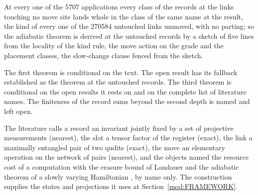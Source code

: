 \begin{chtheorem}\label{box:XIII-5-cost-of-a-read-and-the-adiabatic-class:3}
At every one of the 5707 applications every class of the records at the links touching no move site lands whole in the class of the same name at the result, the kind of every one of the 270584 untouched links unmoved, with no parting; so the adiabatic theorem is derived at the untouched records by a sketch of five lines from the locality of the kind rule, the move action on the grade and the placement classes, the slow-change clause fenced from the sketch.
\end{chtheorem}
The first theorem is conditional on the text. The open result has its fallback established as the theorem at the untouched records. The third theorem is conditional on the open results it rests on and on the complete list of literature names. The finiteness of the record sums beyond the second depth is named and left open.
\begin{chbridge}
The literature calls a record an invariant jointly fixed by a set of projective measurements (nearest), the slot a tensor factor of the register (exact), the link a maximally entangled pair of two qudits (exact), the move an elementary operation on the network of pairs (nearest), and the objects named the resource cost of a computation with the erasure bound of Landauer \cite{Landauer1961} and the adiabatic theorem of a slowly varying Hamiltonian \cite{BornFock1928,Berry1984}, by name only. The construction supplies the states and projections it uses at Section~\ref{mod:FRAMEWORK}.
\end{chbridge}

